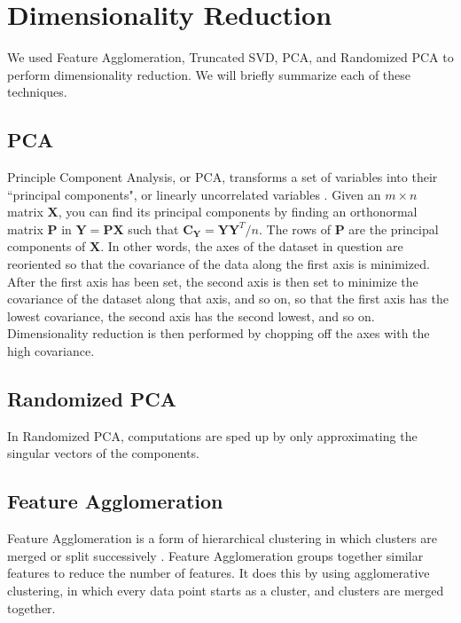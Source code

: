 \documentclass[12pt]{article}
\begin{document}
\section{Dimensionality Reduction}

We used Feature Agglomeration, Truncated SVD, PCA, and Randomized PCA to
perform dimensionality reduction. We will briefly summarize each of these
techniques.

\subsection{PCA}

Principle Component Analysis, or PCA, transforms a set of variables into their
``principal components", or linearly uncorrelated variables
\cite{shlens2014pca}. Given an $m \times n$ matrix $\mathbf{X}$, you can find
its principal components by finding an orthonormal matrix $\mathbf{P}$ in $
\mathbf{Y} = \mathbf{PX} $ such that $\mathbf{C_Y} = \mathbf{YY}^T/n$. The rows
of $\mathbf{P}$ are the principal components of $\mathbf{X}$. In other words,
the axes of the dataset in question are reoriented so that the covariance of
the data along the first axis is minimized. After the first axis has been set,
the second axis is then set to minimize the covariance of the dataset along
that axis, and so on, so that the first axis has the lowest covariance, the
second axis has the second lowest, and so on. Dimensionality reduction is then
performed by chopping off the axes with the high covariance.

\subsection{Randomized PCA}

In Randomized PCA, computations are sped up by only approximating the singular
vectors of the components.

\subsection{Feature Agglomeration}

Feature Agglomeration is a form of hierarchical clustering in which clusters
are merged or split successively \cite{featureagglomeration}. Feature
Agglomeration groups together similar features to reduce the number of
features. It does this by using agglomerative clustering, in which every data
point starts as a cluster, and clusters are merged together.
\end{document}
